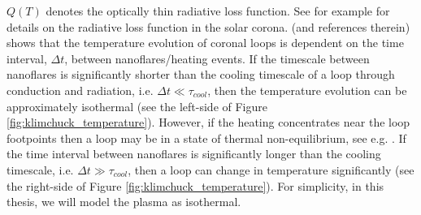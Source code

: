 $Q(T)$ denotes the optically thin radiative loss function. See for example \citet{Rosner1978, Klimchuck2008, Dere2009, Priest2014} for details on the radiative loss function in the solar corona. 
\citet{Klimchuk2015} (and references therein) shows that the temperature evolution of coronal loops is dependent on the time interval, $\Delta t$, between nanoflares/heating events. If the timescale between nanoflares is significantly shorter than the cooling timescale of a loop through conduction and radiation, i.e. $\Delta t \ll \tau_{cool}$, then the temperature evolution can be approximately isothermal (see the left-side of Figure \ref{fig:klimchuck_temperature}). However, if the heating concentrates near the loop footpoints then a loop may be in a state of thermal non-equilibrium, see e.g. \citet{Antiochos2000, Johnston2019}. If the time interval between nanoflares is significantly longer than the cooling timescale, i.e. $\Delta t \gg \tau_{cool}$, then a loop can change in temperature significantly (see the right-side of Figure \ref{fig:klimchuck_temperature}). For simplicity, in this thesis, we will model the plasma as isothermal.

